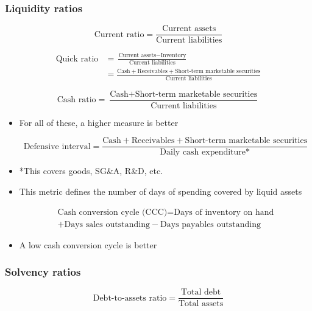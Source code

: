 \documentclass[../notes_compiled.tex]{subfiles}
\begin{document}
\subsubsection{Liquidity ratios}

\begin{equation*}
\text{Current ratio} = \frac{\text{Current assets}}{\text{Current liabilities}}
\end{equation*}

\begin{align*}
\text{Quick ratio} &= \frac{\text{Current assets}-\text{Inventory}}{\text{Current liabilities}} \\
&= \frac{\text{Cash} + \text{Receivables} + \text{Short-term marketable securities}}{\text{Current liabilities}}
\end{align*}

\begin{equation*}
\text{Cash ratio} = \frac{\text{Cash} + \text{Short-term marketable securities}}{\text{Current liabilities}}
\end{equation*}

\begin{itemize}
\item For all of these, a higher measure is better

\begin{equation*}
\text{Defensive interval} = \frac{\text{Cash} + \text{Receivables} + \text{Short-term marketable securities}}{\text{Daily cash expenditure*}}
\end{equation*}
\item[] *This covers goods, SG\&A, R\&D, etc.
\item This metric defines the number of days of spending covered by liquid assets

\begin{multline*}
\text{Cash conversion cycle (CCC)} = \text{Days of inventory on hand} \\ + \text{Days sales outstanding} - \text{Days payables outstanding}
\end{multline*}
\item A low cash conversion cycle is better

\end{itemize}




\subsubsection{Solvency ratios}
\begin{equation*}
\text{Debt-to-assets ratio} = \frac{\text{Total debt}}{\text{Total assets}}
\end{equation*}
\end{document}
